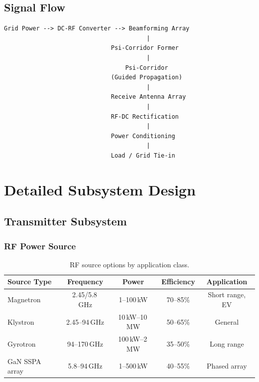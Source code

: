 \documentclass[11pt,a4paper]{article}
\begin{document}
\subsection{Signal Flow}

\begin{verbatim}
Grid Power --> DC-RF Converter --> Beamforming Array
                                        |
                              Psi-Corridor Former
                                        |
                                  Psi-Corridor
                              (Guided Propagation)
                                        |
                              Receive Antenna Array
                                        |
                              RF-DC Rectification
                                        |
                              Power Conditioning
                                        |
                              Load / Grid Tie-in
\end{verbatim}

\section{Detailed Subsystem Design}

\subsection{Transmitter Subsystem}

\subsubsection{RF Power Source}

\begin{table}[h]
\centering
\caption{RF source options by application class.}
\begin{tabular}{lcccc}
\toprule
Source Type & Frequency & Power & Efficiency & Application \\
\midrule
Magnetron & 2.45/5.8\,GHz & 1--100\,kW & 70--85\% & Short range, EV \\
Klystron & 2.45--94\,GHz & 10\,kW--10\,MW & 50--65\% & General \\
Gyrotron & 94--170\,GHz & 100\,kW--2\,MW & 35--50\% & Long range \\
GaN SSPA array & 5.8--94\,GHz & 1--500\,kW & 40--55\% & Phased array \\
\bottomrule
\end{tabular}
\end{table}
\end{document}
